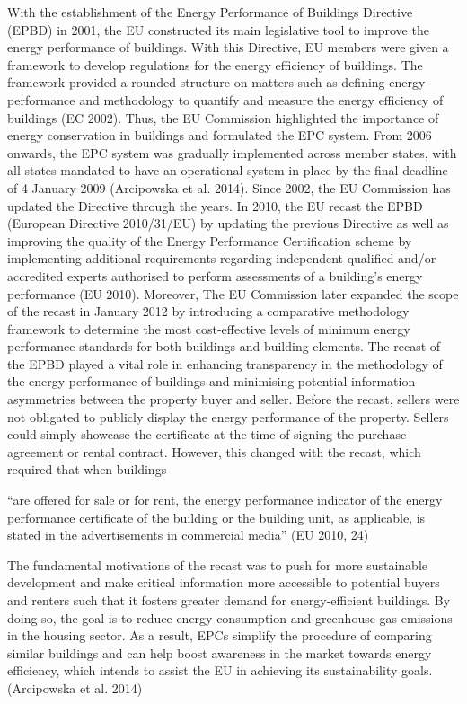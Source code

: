\documentclass[
  letterpaper,
  DIV=11,
  numbers=noendperiod]{scrreprt}
\begin{document}
With the establishment of the Energy Performance of Buildings Directive
(EPBD) in 2001, the EU constructed its main legislative tool to improve
the energy performance of buildings. With this Directive, EU members
were given a framework to develop regulations for the energy efficiency
of buildings. The framework provided a rounded structure on matters such
as defining energy performance and methodology to quantify and measure
the energy efficiency of buildings (EC 2002). Thus, the EU Commission
highlighted the importance of energy conservation in buildings and
formulated the EPC system. From 2006 onwards, the EPC system was
gradually implemented across member states, with all states mandated to
have an operational system in place by the final deadline of 4 January
2009 (Arcipowska et al. 2014). Since 2002, the EU Commission has updated
the Directive through the years. In 2010, the EU recast the EPBD
(European Directive 2010/31/EU) by updating the previous Directive as
well as improving the quality of the Energy Performance Certification
scheme by implementing additional requirements regarding independent
qualified and/or accredited experts authorised to perform assessments of
a building's energy performance (EU 2010). Moreover, The EU Commission
later expanded the scope of the recast in January 2012 by introducing a
comparative methodology framework to determine the most cost-effective
levels of minimum energy performance standards for both buildings and
building elements. The recast of the EPBD played a vital role in
enhancing transparency in the methodology of the energy performance of
buildings and minimising potential information asymmetries between the
property buyer and seller. Before the recast, sellers were not obligated
to publicly display the energy performance of the property. Sellers
could simply showcase the certificate at the time of signing the
purchase agreement or rental contract. However, this changed with the
recast, which required that when buildings

``are offered for sale or for rent, the energy performance indicator of
the energy performance certificate of the building or the building unit,
as applicable, is stated in the advertisements in commercial media'' (EU
2010, 24)

The fundamental motivations of the recast was to push for more
sustainable development and make critical information more accessible to
potential buyers and renters such that it fosters greater demand for
energy-efficient buildings. By doing so, the goal is to reduce energy
consumption and greenhouse gas emissions in the housing sector. As a
result, EPCs simplify the procedure of comparing similar buildings and
can help boost awareness in the market towards energy efficiency, which
intends to assist the EU in achieving its sustainability goals.
(Arcipowska et al. 2014)
\end{document}
